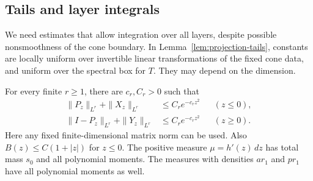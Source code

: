 \subsection{Tails and layer integrals}
We need estimates that allow integration over all layers, despite possible nonsmoothness of the cone boundary. In Lemma~\ref{lem:projection-tails}, constants are locally uniform over invertible linear transformations of the fixed cone data, and uniform over the spectral box for \(T\). They may depend on the dimension.

\begin{lemma}\label{lem:projection-tails}
For every finite \(r\ge1\), there are \(c_r,C_r>0\) such that
\[
\begin{aligned}
\|P_z\|_{L^r}+\|X_z\|_{L^r}&\le C_re^{-c_rz^2}&& (z\le0),\\
\|I-P_z\|_{L^r}+\|Y_z\|_{L^r}&\le C_re^{-c_rz^2}&& (z\ge0).
\end{aligned}
\]
Here any fixed finite-dimensional matrix norm can be used. Also \(B(z)\le C(1+|z|)\) for \(z\le0\). The positive measure \(\mu=h'(z)\,dz\) has total mass \(s_0\) and all polynomial moments. The measures with densities \(ar_1\) and \(pr_1\) have all polynomial moments as well.
\end{lemma}
